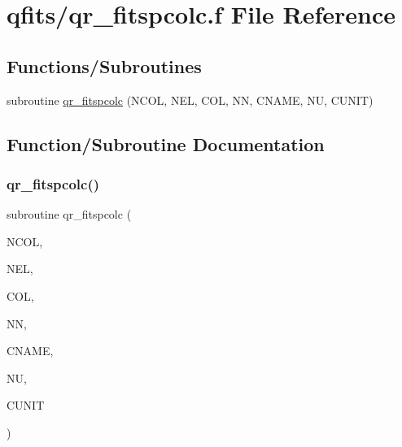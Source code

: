 \hypertarget{qr__fitspcolc_8f}{}\section{qfits/qr\+\_\+fitspcolc.f File Reference}
\label{qr__fitspcolc_8f}
\subsection*{Functions/\+Subroutines}
\begin{DoxyCompactItemize}
\item 
subroutine \hyperlink{qr__fitspcolc_8f_a6a56783bc67aca68f5bdcb1eee379ef6}{qr\+\_\+fitspcolc} (N\+C\+OL, N\+EL, C\+OL, NN, C\+N\+A\+ME, NU, C\+U\+N\+IT)
\end{DoxyCompactItemize}


\subsection{Function/\+Subroutine Documentation}
\mbox{\label{qr__fitspcolc_8f_a6a56783bc67aca68f5bdcb1eee379ef6}} 
\subsubsection{\texorpdfstring{qr\+\_\+fitspcolc()}{qr\_fitspcolc()}}
{\footnotesize\ttfamily subroutine qr\+\_\+fitspcolc (\begin{DoxyParamCaption}\item[{integer}]{N\+C\+OL,  }\item[{integer}]{N\+EL,  }\item[{complex, dimension(nel)}]{C\+OL,  }\item[{integer}]{NN,  }\item[{character$\ast$(nn)}]{C\+N\+A\+ME,  }\item[{integer}]{NU,  }\item[{character$\ast$(nu)}]{C\+U\+N\+IT }\end{DoxyParamCaption})}

